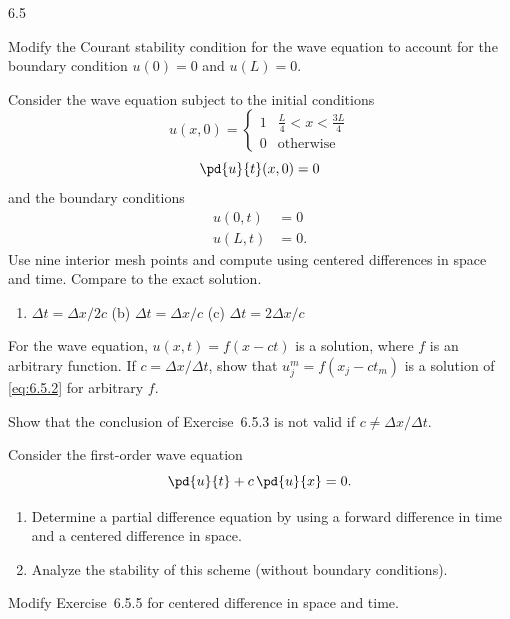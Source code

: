 \begin{exercises}{6.5}
\item Modify the Courant stability condition for the wave equation to account for the boundary condition $u(0) = 0$ and $u(L) = 0$.

\item Consider the wave equation subject to the initial conditions
\[
u(x,0) = \begin{cases} 1 & \frac{L}{4} < x < \frac{3L}{4} \\ 0 & \text{otherwise}\end{cases}
\]
\[
\pd{u}{t}(x,0) = 0
\]
and the boundary conditions
\begin{align*}
u(0,t) &= 0 \\
u(L,t) &= 0.
\end{align*}
Use nine interior mesh points and compute using centered differences in space and time.  Compare to the exact solution.
\begin{enumerate}
\item[(a)] $\Delta t = \Delta x/2c$ \qquad (b) $\Delta t = \Delta x/c$ \qquad (c) $\Delta t = 2\Delta x/c$
\end{enumerate}

\item For the wave equation, $u(x,t) = f(x - ct)$ is a solution, where $f$ is an arbitrary function.  If $c = \Delta x/\Delta t$, show that $u_j^m = f(x_j - ct_m)$ is a solution of \eqref{eq:6.5.2} for arbitrary $f$.

\item Show that the conclusion of Exercise~6.5.3 is not valid if $c \ne \Delta x/\Delta t$.

\item Consider the first-order wave equation
\[
\pd{u}{t} + c\,\pd{u}{x} = 0.
\]
\begin{enumerate}
\item[(a)] Determine a partial difference equation by using a forward difference in time and a centered difference in space.
\item[\starred (b)] Analyze the stability of this scheme (without boundary conditions).
\end{enumerate}

\item[\starred 6.5.6.] Modify Exercise~6.5.5 for centered difference in space and time.


\end{exercises}
